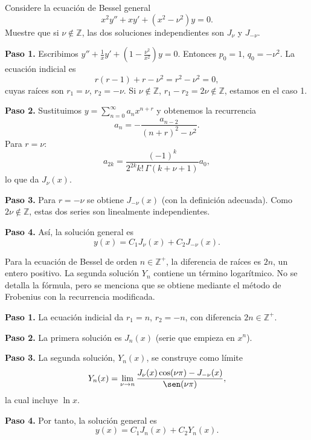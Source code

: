 \begin{example}
  Considere la ecuación de Bessel general
  \[
    x^2 y'' + x y' + (x^2-\nu^2)y=0.
  \]
  Muestre que si $\nu\notin \mathbb Z$, las dos soluciones independientes son $J_\nu$ y $J_{-\nu}$.
  \begin{myproof}
    \textbf{Paso 1.} Escribimos $y''+\frac{1}{x}y'+\left(1-\frac{\nu^2}{x^2}\right)y=0$. Entonces $p_0=1$, $q_0=-\nu^2$. La ecuación indicial es
    \[
      r(r-1)+r-\nu^2 = r^2-\nu^2 = 0,
    \]
    cuyas raíces son $r_1=\nu$, $r_2=-\nu$. Si $\nu\notin \mathbb Z$, $r_1-r_2=2\nu\notin \mathbb Z$, estamos en el caso 1.
    
    \textbf{Paso 2.} Sustituimos $y=\sum_{n=0}^{\infty} a_n x^{n+r}$ y obtenemos la recurrencia
    \[
      a_n = -\frac{a_{n-2}}{(n+r)^2-\nu^2}.
    \]
    Para $r=\nu$:
    \[
      a_{2k} = \frac{(-1)^k}{2^{2k} k!\, \Gamma(k+\nu+1)} a_0,
    \]
    lo que da $J_\nu(x)$.
    
    \textbf{Paso 3.} Para $r=-\nu$ se obtiene $J_{-\nu}(x)$ (con la definición adecuada). Como $2\nu\notin \mathbb Z$, estas dos series son linealmente independientes.
    
    \textbf{Paso 4.} Así, la solución general es
    \[
      \boxed{
        y(x)=C_1 J_\nu(x) + C_2 J_{-\nu}(x)
      }.
    \]
  \end{myproof}
\end{example}

\begin{example}
  Para la ecuación de Bessel de orden $n\in\mathbb Z^+$, la diferencia de raíces es $2n$, un entero positivo. La segunda solución $Y_n$ contiene un término logarítmico. No se detalla la fórmula, pero se menciona que se obtiene mediante el método de Frobenius con la recurrencia modificada.
  \begin{myproof}
    \textbf{Paso 1.} La ecuación indicial da $r_1=n$, $r_2=-n$, con diferencia $2n\in\mathbb Z^+$.
    
    \textbf{Paso 2.} La primera solución es $J_n(x)$ (serie que empieza en $x^n$).
    
    \textbf{Paso 3.} La segunda solución, $Y_n(x)$, se construye como límite
    \[
      Y_n(x)=\lim_{\nu\to n} \frac{J_\nu(x)\cos(\nu\pi)-J_{-\nu}(x)}{\sen(\nu\pi)},
    \]
    la cual incluye $\ln x$.
    
    \textbf{Paso 4.} Por tanto, la solución general es
    \[
      \boxed{
        y(x)=C_1 J_n(x)+C_2 Y_n(x)
      }.
    \]
  \end{myproof}
\end{example}

